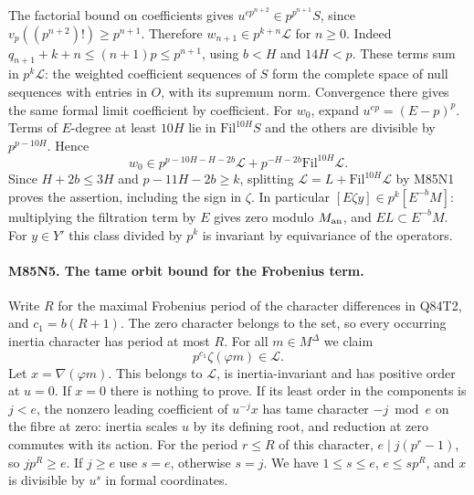 The factorial bound on coefficients gives
$u^{ep^{n+2}}\in p^{p^{n+1}} S$, since
$v_p((p^{n+2})!)\ge p^{n+1}$. Therefore
$w_{n+1}\in p^{k+n}\mathcal L$ for $n\ge0$. Indeed
$q_{n+1}+k+n\le (n+1)p\le p^{n+1}$, using $b<H$ and
$14H<p$. These terms sum in $p^k\mathcal L$:
the weighted coefficient sequences of $S$ form the complete
space of null sequences with entries in $O$, with its supremum
norm. Convergence there gives the same formal limit coefficient
by coefficient. For $w_0$, expand
$u^{ep}=(E-p)^p$. Terms of $E$-degree at least $10H$ lie in
$\mathrm{Fil}^{10H}S$ and the others are divisible by $p^{p-10H}$.
Hence
\[
 w_0\in p^{p-10H-H-2b}\mathcal L+
                p^{-H-2b}\mathrm{Fil}^{10H}\mathcal L.
\]
Since $H+2b\le3H$ and $p-11H-2b\ge k$,
splitting $\mathcal L=L+\mathrm{Fil}^{10H}\mathcal L$ by M85N1
proves the assertion, including the sign in $\zeta$.
In particular $[E\zeta y]\in p^k [E^{-b}M]$: multiplying
the filtration term by $E$ gives zero modulo $M_{\rm an}$,
and $EL\subset E^{-b}M$. For $y\in Y'$ this class divided
by $p^k$ is invariant by equivariance of the operators.

\paragraph{M85N5. The tame orbit bound for the Frobenius term.}
Write $R$ for the maximal Frobenius period of the character
differences in Q84T2, and $c_1=b(R+1)$. The zero character
belongs to the set, so every occurring inertia character has
period at most $R$. For all $m\in M^\Delta$ we claim
\[
                   p^{c_1}\zeta(\varphi m)\in\mathcal L .
\]
Let $x=\nabla(\varphi m)$. This belongs to $\mathcal L$, is
inertia-invariant and has positive order at $u=0$. If $x=0$
there is nothing to prove. If its least order in the components
is $j<e$, the nonzero leading coefficient of $u^{-j}x$
has tame character $-j\bmod e$ on the fibre at zero: inertia
scales $u$ by its defining root, and reduction at zero commutes
with its action. For the period $r\le R$ of this character,
$e\mid j(p^r-1)$, so $j p^R\ge e$. If $j\ge e$ use $s=e$,
otherwise $s=j$. We have $1\le s\le e$, $e\le sp^R$, and
$x$ is divisible by $u^s$ in formal coordinates.

